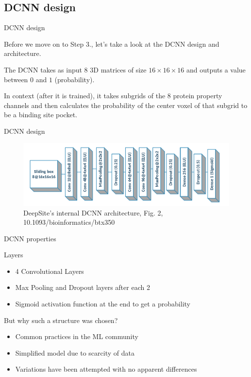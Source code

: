 \documentclass{beamer}
\begin{document}
\subsection{DCNN design}

\begin{frame}{DCNN design}
  \begin{block}{}
    Before we move on to Step 3., let's take a look at the DCNN design and architecture.

    The DCNN takes as input $8$ 3D matrices of size $16 \times 16 \times 16$ and outputs a value between $0$ and $1$ (probability).

    In context (after it is trained), it takes subgrids of the 8 protein property channels and then calculates the probability of the center voxel of that subgrid to be a binding site pocket.
  \end{block}
\end{frame}

\begin{frame}{DCNN design}
  \begin{figure}[h]
    \includegraphics[width=1\textwidth]{deepsite_dcnn_architecture}
    \caption{DeepSite’s internal DCNN architecture, Fig. 2, 10.1093/bioinformatics/btx350}
  \end{figure}
\end{frame}

\begin{frame}{DCNN properties}
  \begin{block}{Layers}
    \begin{itemize}
      \item 4 Convolutional Layers
      \item Max Pooling and Dropout layers after each 2
      \item Sigmoid activation function at the end to get a probability
    \end{itemize}
  \end{block}
  \begin{block}{But why such a structure was chosen?}
    \begin{itemize}
      \item Common practices in the ML community
      \item Simplified model due to scarcity of data
      \item Variations have been attempted with no apparent differences
    \end{itemize}
  \end{block}
\end{frame}
\end{document}
